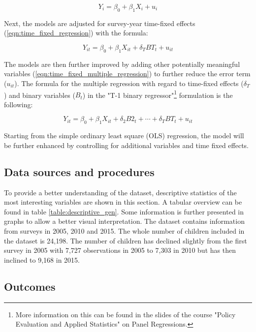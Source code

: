 \documentclass[a4paper, 11pt]{article} %
\begin{document}
\begin{equation}
 Y_i = \beta_0 + \beta_1 X_i + u_i
 \label{eqn:simple_regression}
\end{equation}

Next, the models are adjusted for survey-year time-fixed effects (\ref{eqn:time_fixed_regression}) with the formula:

\begin{equation}
Y_{it} = \beta_0 + \beta_1 X_{it} + \delta_T BT_t + u_{it}
 \label{eqn:time_fixed_regression}
\end{equation}

The models are then further improved by adding other potentially meaningful variables (\ref{eqn:time_fixed_multiple_regression}) to further reduce the error term ($u_{it}$). The formula for the multiple regression with regard to time-fixed effects ($\delta_T$) and binary variables ($B_t$) in the "T-1 binary regressor"\footnote{More information on this can be found in the slides of the course "Policy Evaluation and Applied Statistics" on Panel Regressions. } formulation is the following:

\begin{equation}
Y_{it} = \beta_0 + \beta_1 X_{it} + \delta_2 B2_t + \cdots + \delta_T BT_t + u_{it}
 \label{eqn:time_fixed_multiple_regression}
\end{equation}

Starting from the simple ordinary least square (OLS) regression, the model will be further enhanced by controlling for additional variables and time fixed effects. 

\subsection*{Data sources and procedures}
To provide a better understanding of the dataset, descriptive statistics of the most interesting variables are shown in this section. A tabular overview can be found in table \ref{table:descriptive_gen}. Some information is further presented in graphs to allow a better visual interpretation. The dataset contains information from surveys in 2005, 2010 and 2015. The whole number of children included in the dataset is 24,198. The number of children has declined slightly from the first survey in 2005 with 7,727 observations in 2005 to 7,303 in 2010 but has then inclined to 9,168 in 2015. \\

\subsection*{Outcomes}
\end{document}

